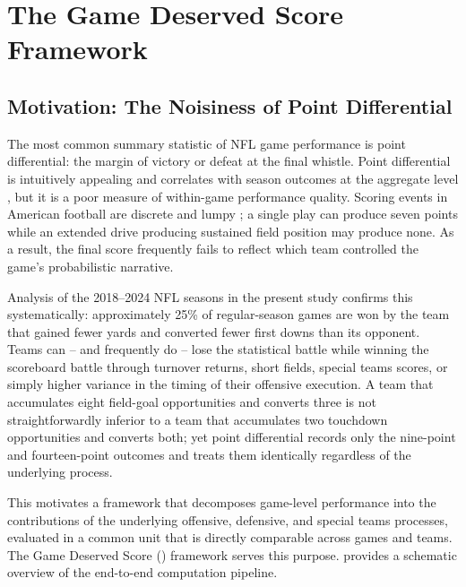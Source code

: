 \section{The Game Deserved Score Framework}
\label{sec:gds}

\subsection{Motivation: The Noisiness of Point Differential}

The most common summary statistic of NFL game performance is point differential:
the margin of victory or defeat at the final whistle. Point differential is
intuitively appealing and correlates with season outcomes at the aggregate
level \parencite{stern1991probability}, but it is a poor measure of within-game
performance quality. Scoring
events in American football are discrete and lumpy \parencite{lopez2018randomness}; a single play can produce
seven points while an extended drive producing sustained field position may
produce none. As a result, the final score frequently fails to reflect which
team controlled the game's probabilistic narrative.

Analysis of the 2018--2024 NFL seasons in the present study confirms this
systematically: approximately 25\% of regular-season games are won by the team
that gained fewer yards and converted fewer first downs than its opponent. Teams can -- and
frequently do -- lose the statistical battle while winning the scoreboard battle
through turnover returns, short fields, special teams scores, or simply higher
variance in the timing of their offensive execution. A team that accumulates
eight field-goal opportunities and converts three is not straightforwardly
inferior to a team that accumulates two touchdown opportunities and converts
both; yet point differential records only the nine-point and fourteen-point
outcomes and treats them identically regardless of the underlying process.

This motivates a framework that decomposes game-level performance into the
contributions of the underlying offensive, defensive, and special teams
processes, evaluated in a common unit that is directly comparable across games
and teams. The Game Deserved Score (\gds{}) framework serves this purpose.
 provides a schematic overview of the end-to-end
computation pipeline.

